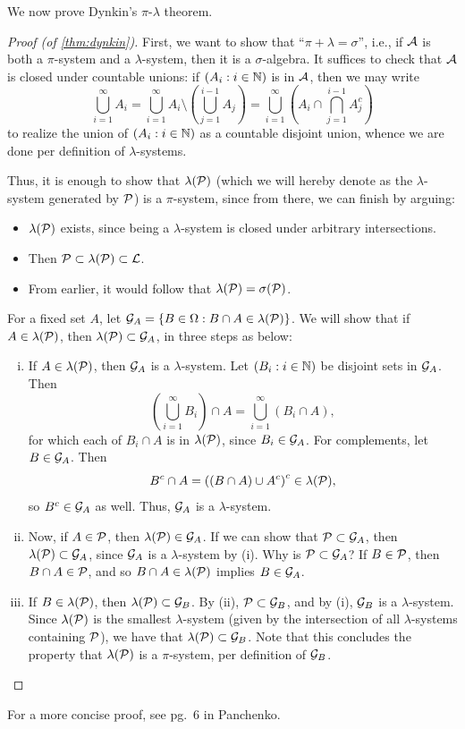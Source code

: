We now prove Dynkin's $\pi$-$\lambda$ theorem.
\begin{proof}[Proof (of \ref{thm:dynkin})]
    First, we want to show that ``$\pi + \lambda = \sigma$'', i.e., if $\mathcal A$ is both a $\pi$-system and a $\lambda$-system, then it is a $\sigma$-algebra. It suffices to check that $\mathcal A$ is closed under countable unions: if $(A_i : i \in \mathbb N)$ is in $\mathcal A$, then we may write
    \[ \bigcup_{i=1}^\infty A_i = \bigcup_{i=1}^\infty A_i \setminus \left(\bigcup_{j=1}^{i-1} A_j\right) = \bigcup_{i=1}^\infty \left(A_i \cap \bigcap_{j=1}^{i-1} A_j^c\right) \]
    to realize the union of $(A_i : i \in \mathbb N)$ as a countable disjoint union, whence we are done per definition of $\lambda$-systems.

    Thus, it is enough to show that $\lambda(\mathcal P)$ (which we will hereby denote as the $\lambda$-system generated by $\mathcal P$) is a $\pi$-system, since from there, we can finish by arguing:
    \begin{itemize}
        \item $\lambda(\mathcal P)$ exists, since being a $\lambda$-system is closed under arbitrary intersections.
        \item Then $\mathcal P \subset \lambda(\mathcal P) \subset \mathcal L$.
        \item From earlier, it would follow that $\lambda(\mathcal P) = \sigma(\mathcal P)$.
    \end{itemize}

    For a fixed set $A$, let $\mathcal G_A = \{B \in \Omega : B \cap A \in \lambda(\mathcal P)\}$. We will show that if $A \in \lambda(\mathcal P)$, then $\lambda(\mathcal P) \subset \mathcal G_A$, in three steps as below:
    \begin{enumerate}[(i)]
        \item If $A \in \lambda(\mathcal P)$, then $\mathcal G_A$ is a $\lambda$-system. Let $(B_i : i \in \mathbb N)$ be disjoint sets in $\mathcal G_A$. Then
        \[ \left(\bigcup_{i=1}^\infty B_i\right) \cap A = \bigcup_{i=1}^\infty (B_i \cap A), \]
        for which each of $B_i \cap A$ is in $\lambda(\mathcal P)$, since $B_i \in \mathcal G_A$. For complements, let $B \in \mathcal G_A$. Then
        \[ B^c \cap A = \left((B \cap A) \cup A^c\right)^c \in \lambda(\mathcal P), \]
        so $B^c \in \mathcal G_A$ as well. Thus, $\mathcal G_A$ is a $\lambda$-system.
        \item Now, if $A \in \mathcal P$, then $\lambda(\mathcal P) \in \mathcal G_A$. If we can show that $\mathcal P \subset \mathcal G_A$, then $\lambda(\mathcal P) \subset \mathcal G_A$, since $\mathcal G_A$ is a $\lambda$-system by (i). Why is $\mathcal P \subset \mathcal G_A$? If $B \in \mathcal P$, then $B \cap A \in \mathcal P$, and so $B \cap A \in \lambda(\mathcal P)$ implies $B \in \mathcal G_A$.
        \item If $B \in \lambda(\mathcal P)$, then $\lambda(\mathcal P) \subset \mathcal G_B$. By (ii), $\mathcal P \subset \mathcal G_B$, and by (i), $\mathcal G_B$ is a $\lambda$-system. Since $\lambda(\mathcal P)$ is the smallest $\lambda$-system (given by the intersection of all $\lambda$-systems containing $\mathcal P$), we have that $\lambda(\mathcal P) \subset \mathcal G_B$. Note that this concludes the property that $\lambda(\mathcal P)$ is a $\pi$-system, per definition of $\mathcal G_B$. \qedhere
    \end{enumerate}
\end{proof}
For a more concise proof, see pg.\ 6 in Panchenko.